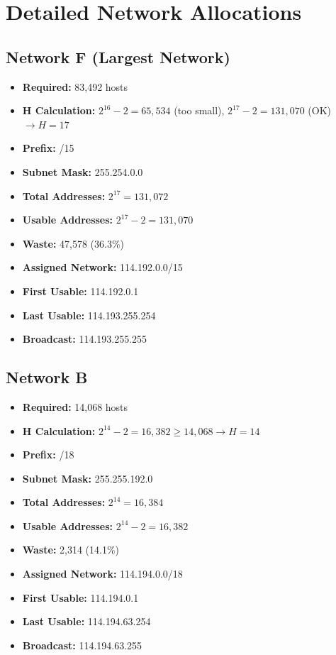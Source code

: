 \documentclass[12pt,a4paper]{report}
\begin{document}
\section{Detailed Network Allocations}

\subsection{Network F (Largest Network)}

\begin{itemize}
    \item \textbf{Required:} 83,492 hosts
    \item \textbf{H Calculation:} $2^{16} - 2 = 65,534$ (too small), $2^{17} - 2 = 131,070$ (OK) $\rightarrow H = 17$
    \item \textbf{Prefix:} /15
    \item \textbf{Subnet Mask:} 255.254.0.0
    \item \textbf{Total Addresses:} $2^{17} = 131,072$
    \item \textbf{Usable Addresses:} $2^{17} - 2 = 131,070$
    \item \textbf{Waste:} 47,578 (36.3\%)
    \item \textbf{Assigned Network:} 114.192.0.0/15
    \item \textbf{First Usable:} 114.192.0.1
    \item \textbf{Last Usable:} 114.193.255.254
    \item \textbf{Broadcast:} 114.193.255.255
\end{itemize}

\subsection{Network B}

\begin{itemize}
    \item \textbf{Required:} 14,068 hosts
    \item \textbf{H Calculation:} $2^{14} - 2 = 16,382 \geq 14,068 \rightarrow H = 14$
    \item \textbf{Prefix:} /18
    \item \textbf{Subnet Mask:} 255.255.192.0
    \item \textbf{Total Addresses:} $2^{14} = 16,384$
    \item \textbf{Usable Addresses:} $2^{14} - 2 = 16,382$
    \item \textbf{Waste:} 2,314 (14.1\%)
    \item \textbf{Assigned Network:} 114.194.0.0/18
    \item \textbf{First Usable:} 114.194.0.1
    \item \textbf{Last Usable:} 114.194.63.254
    \item \textbf{Broadcast:} 114.194.63.255
\end{itemize}
\end{document}
